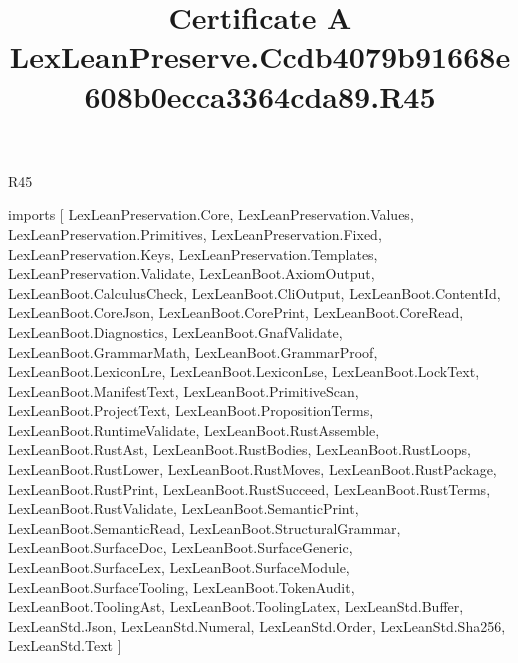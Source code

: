 \begin{lexlean}{R45}
\title{Certificate A LexLeanPreserve.Ccdb4079b91668e608b0ecca3364cda89.R45}
\begin{coremodule}
imports [
  LexLeanPreservation.Core,
  LexLeanPreservation.Values,
  LexLeanPreservation.Primitives,
  LexLeanPreservation.Fixed,
  LexLeanPreservation.Keys,
  LexLeanPreservation.Templates,
  LexLeanPreservation.Validate,
  LexLeanBoot.AxiomOutput,
  LexLeanBoot.CalculusCheck,
  LexLeanBoot.CliOutput,
  LexLeanBoot.ContentId,
  LexLeanBoot.CoreJson,
  LexLeanBoot.CorePrint,
  LexLeanBoot.CoreRead,
  LexLeanBoot.Diagnostics,
  LexLeanBoot.GnafValidate,
  LexLeanBoot.GrammarMath,
  LexLeanBoot.GrammarProof,
  LexLeanBoot.LexiconLre,
  LexLeanBoot.LexiconLse,
  LexLeanBoot.LockText,
  LexLeanBoot.ManifestText,
  LexLeanBoot.PrimitiveScan,
  LexLeanBoot.ProjectText,
  LexLeanBoot.PropositionTerms,
  LexLeanBoot.RuntimeValidate,
  LexLeanBoot.RustAssemble,
  LexLeanBoot.RustAst,
  LexLeanBoot.RustBodies,
  LexLeanBoot.RustLoops,
  LexLeanBoot.RustLower,
  LexLeanBoot.RustMoves,
  LexLeanBoot.RustPackage,
  LexLeanBoot.RustPrint,
  LexLeanBoot.RustSucceed,
  LexLeanBoot.RustTerms,
  LexLeanBoot.RustValidate,
  LexLeanBoot.SemanticPrint,
  LexLeanBoot.SemanticRead,
  LexLeanBoot.StructuralGrammar,
  LexLeanBoot.SurfaceDoc,
  LexLeanBoot.SurfaceGeneric,
  LexLeanBoot.SurfaceLex,
  LexLeanBoot.SurfaceModule,
  LexLeanBoot.SurfaceTooling,
  LexLeanBoot.TokenAudit,
  LexLeanBoot.ToolingAst,
  LexLeanBoot.ToolingLatex,
  LexLeanStd.Buffer,
  LexLeanStd.Json,
  LexLeanStd.Numeral,
  LexLeanStd.Order,
  LexLeanStd.Sha256,
  LexLeanStd.Text
]


\end{coremodule}
\end{lexlean}
